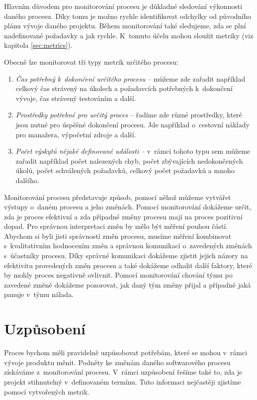 \documentclass[czech,master]{diploma}
\begin{document}
Hlavním důvodem pro monitorování procesu je důkladné sledování výkonnosti daného procesu. Díky tomu je možno rychle identifikovat odchylky od původního plánu vývoje daného projektu. Během monitorování také sledujeme, zda se plní nadefinované požadavky a jak rychle. K~tomuto účelu mohou sloužit metriky (viz kapitola \ref{sec:metrics}).

Obecně lze monitorovat tři typy metrik určitého procesu:

\begin{enumerate}
\item \textit{Čas potřebný k~dokončení určitého procesu} -- můžeme zde zařadit například celkový čas strávený na úkolech a požadavcích potřebných k~dokončení vývoje, čas strávený testováním a další.

\item \textit{Prostředky potřebné pro určitý proces} -- řadíme zde různé prostředky, které jsou nutné pro úspěšné dokončení procesu. Jde například o~cestovní náklady pro manažera, výpočetní zdroje a další.

\item \textit{Počet výskytů nějaké definované události} -- v~rámci tohoto typu sem můžeme zařadit například počet nalezených chyb, počet zbývajících nedokončených úkolů, počet schválených požadavků, celkový počet požadavků a mnoho dalšího.
\end{enumerate}

Monitorování procesu představuje způsob, pomocí něhož můžeme vytvářet výstupy o~daném procesu a jeho změnách. Pomocí monitorování dokážeme určit, zda je proces efektivní a zda případné změny procesu mají na proces pozitivní dopad. Pro správnou interpretaci změn by mělo být měření pouhou částí. Abychom si byli jisti správností změn procesu, musíme měření kombinovat s~kvalitativním hodnocením změn a správnou komunikací o~zavedených změnách s~účastníky procesu. Díky správné komunikaci dokážeme zjistit jejich názory na efektivitu provedených změn procesu a také dokážeme odhalit další faktory, které by mohly proces negativně ovlivnit. Pomocí monitorování chování týmu po zavedené změně dokážeme pozorovat, jak daný tým změny přijal a případně jaká panuje v~týmu nálada.

\section{Uzpůsobení}
\label{sec:control}
Proces bychom měli pravidelně uzpůsobovat potřebám, které se mohou v~rámci vývoje produktu měnit. Podněty ke změnám daného softwarového procesu získáváme z~monitorování procesu. V~rámci uzpůsobení řešíme také to, zda je projekt stihnutelný v~definovaném termínu. Tuto informaci nejčastěji zjistíme pomocí vytvořených metrik.
\end{document}
